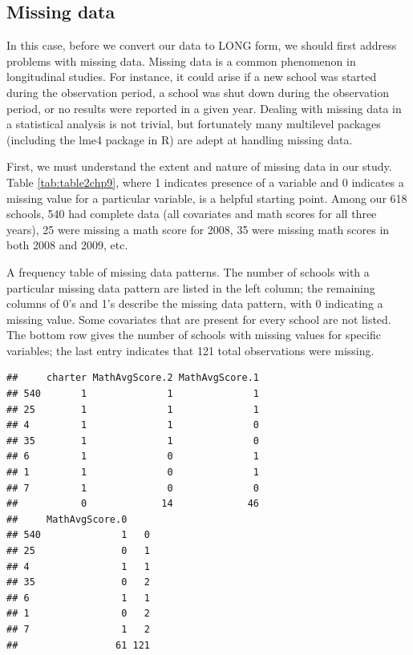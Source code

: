 \documentclass[
]{krantz}
\begin{document}
\hypertarget{missing}{%
\subsection{Missing data}\label{missing}}

In this case, before we convert our data to LONG form, we should first address problems with missing data. Missing data is a common phenomenon in longitudinal studies. For instance, it could arise if a new school was started during the observation period, a school was shut down during the observation period, or no results were reported in a given year. Dealing with missing data in a statistical analysis is not trivial, but fortunately many multilevel packages (including the lme4 package in R) are adept at handling missing data.

First, we must understand the extent and nature of missing data in our study. Table \ref{tab:table2chp9}, where 1 indicates presence of a variable and 0 indicates a missing value for a particular variable, is a helpful starting point. Among our 618 schools, 540 had complete data (all covariates and math scores for all three years), 25 were missing a math score for 2008, 35 were missing math scores in both 2008 and 2009, etc.

\label{tab:table2chp9} A frequency table of missing data patterns. The number of schools with a particular missing data pattern are listed in the left column; the remaining columns of 0's and 1's describe the missing data pattern, with 0 indicating a missing value. Some covariates that are present for every school are not listed. The bottom row gives the number of schools with missing values for specific variables; the last entry indicates that 121 total observations were missing.

\begin{verbatim}
##     charter MathAvgScore.2 MathAvgScore.1
## 540       1              1              1
## 25        1              1              1
## 4         1              1              0
## 35        1              1              0
## 6         1              0              1
## 1         1              0              1
## 7         1              0              0
##           0             14             46
##     MathAvgScore.0    
## 540              1   0
## 25               0   1
## 4                1   1
## 35               0   2
## 6                1   1
## 1                0   2
## 7                1   2
##                 61 121
\end{verbatim}
\end{document}
